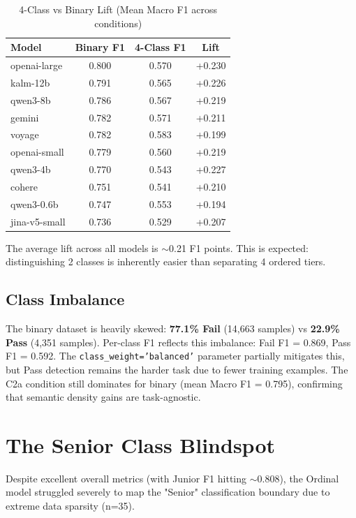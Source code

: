 \documentclass[11pt]{article}
\begin{document}
\begin{table}[htbp]
\centering
\caption{4-Class vs Binary Lift (Mean Macro F1 across conditions)}
\begin{tabular}{lccc}
\toprule
\textbf{Model} & \textbf{Binary F1} & \textbf{4-Class F1} & \textbf{Lift} \\
\midrule
openai-large & 0.800 & 0.570 & +0.230 \\
kalm-12b & 0.791 & 0.565 & +0.226 \\
qwen3-8b & 0.786 & 0.567 & +0.219 \\
gemini & 0.782 & 0.571 & +0.211 \\
voyage & 0.782 & 0.583 & +0.199 \\
openai-small & 0.779 & 0.560 & +0.219 \\
qwen3-4b & 0.770 & 0.543 & +0.227 \\
cohere & 0.751 & 0.541 & +0.210 \\
qwen3-0.6b & 0.747 & 0.553 & +0.194 \\
jina-v5-small & 0.736 & 0.529 & +0.207 \\
\bottomrule
\end{tabular}
\end{table}

The average lift across all models is $\sim$0.21 F1 points. This is expected: distinguishing 2 classes is inherently easier than separating 4 ordered tiers.

\subsection{Class Imbalance}

The binary dataset is heavily skewed: \textbf{77.1\% Fail} (14,663 samples) vs \textbf{22.9\% Pass} (4,351 samples). Per-class F1 reflects this imbalance: Fail F1 = 0.869, Pass F1 = 0.592. The \texttt{class\_weight='balanced'} parameter partially mitigates this, but Pass detection remains the harder task due to fewer training examples. The C2a condition still dominates for binary (mean Macro F1 = 0.795), confirming that semantic density gains are task-agnostic.

\section{The Senior Class Blindspot}

Despite excellent overall metrics (with Junior F1 hitting $\sim$0.808), the Ordinal model struggled severely to map the "Senior" classification boundary due to extreme data sparsity (n=35). 
\end{document}
